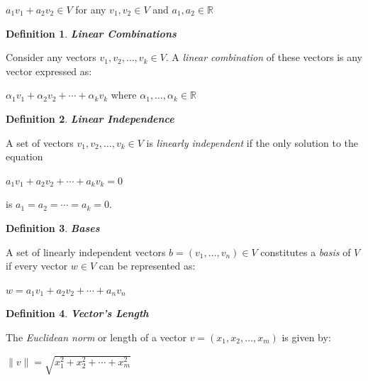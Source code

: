 \documentclass[a4paper,12pt]{report}
\newtheorem{definition}{Definition}[section]
\newcommand{\R}{\mathbb{R}}
\begin{document}
\begin{center}
   $a_1v_1 + a_2v_2 \in V$ for any $v_1,v_2 \in V$ and $a_1,a_2 \in \R$
\end{center}

\begin{definition}
    \textbf{Linear Combinations}
\end{definition}

Consider any vectors $v_1, v_2, \ldots, v_k \in V$. A \textit{linear combination} of these vectors is any vector expressed as:

\begin{center}
    $\alpha_1v_1 + \alpha_2v_2 + \cdots + \alpha_kv_k$ where $\alpha_1, \ldots, \alpha_k \in \R$
\end{center}

\begin{definition}
    \textbf{Linear Independence}
\end{definition}

A set of vectors $v_1, v_2, \ldots, v_k \in V$ is \textit{linearly independent} if the only solution to the equation

\begin{center}
    $a_1v_1 + a_2v_2 + \cdots + a_kv_k = 0$
\end{center}

is $a_1 = a_2 = \cdots = a_k = 0$.

\begin{definition}
    \textbf{Bases}
\end{definition}

A set of linearly independent vectors $b = (v_1, \ldots, v_n) \in V$ constitutes a \textit{basis} of $V$ if every vector $w \in V$ can be represented as:

\begin{center}
    $w = a_1v_1 + a_2v_2 + \cdots + a_nv_n$
\end{center}

\begin{definition}
    \textbf{Vector's Length}
\end{definition}

The \textit{Euclidean norm} or length of a vector $v = (x_1, x_2, \ldots, x_m)$ is given by:

\begin{center}
    $\lVert v \rVert = \sqrt{x_1^2 + x_2^2 + \cdots + x_m^2}$
\end{center}
\end{document}
